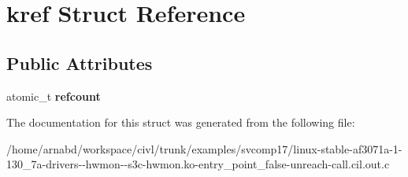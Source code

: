 \hypertarget{structkref}{}\section{kref Struct Reference}
\label{structkref}
\subsection*{Public Attributes}
\begin{DoxyCompactItemize}
\item 
\hypertarget{structkref_a0d96318d7dd817600483f49523565ed9}{}atomic\+\_\+t {\bfseries refcount}\label{structkref_a0d96318d7dd817600483f49523565ed9}

\end{DoxyCompactItemize}


The documentation for this struct was generated from the following file\+:\begin{DoxyCompactItemize}
\item 
/home/arnabd/workspace/civl/trunk/examples/svcomp17/linux-\/stable-\/af3071a-\/1-\/130\+\_\+7a-\/drivers-\/-\/hwmon-\/-\/s3c-\/hwmon.\+ko-\/entry\+\_\+point\+\_\+false-\/unreach-\/call.\+cil.\+out.\+c\end{DoxyCompactItemize}
